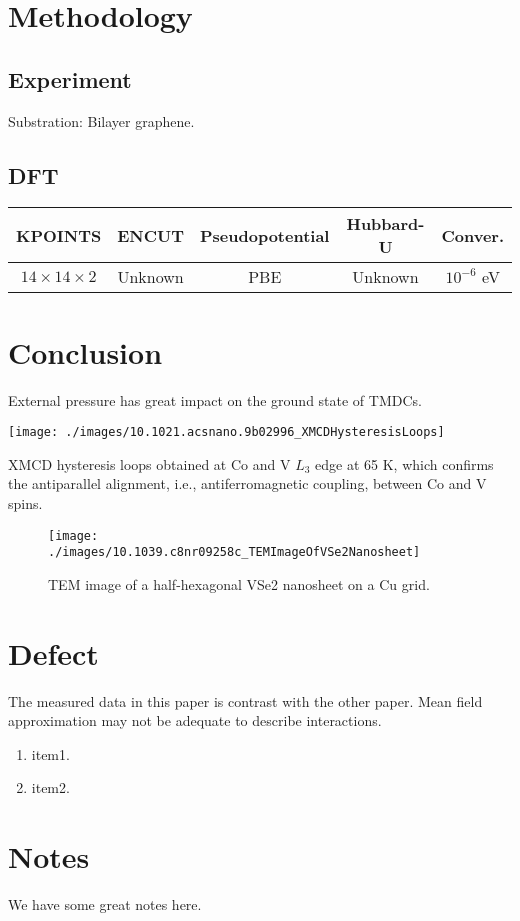 \section{Methodology}

\subsection{Experiment}
Substration: Bilayer graphene.

\subsection{DFT}
\begin{table}[h]
    \begin{tabular}{ccccc}
    \toprule
    KPOINTS                 & ENCUT  & Pseudopotential & Hubbard-U & Conver.      \\
    \midrule
    $14 \times 14 \times 2$ & Unknown& PBE             & Unknown   & $10^{-6}$ eV \\
    \bottomrule
    \end{tabular}
\end{table}

\section{Conclusion}
External pressure has great impact on the ground state of TMDCs.

\begin{marginfigure}
    \texttt{[image: ./images/10.1021.acsnano.9b02996\_XMCDHysteresisLoops]}
	\caption[XMCD hysteresis loops obtained at Co and V $L_3$ edge at 65 K]{
        XMCD hysteresis loops obtained at Co and V $L_3$ edge at 65 K, which confirms the antiparallel alignment, i.e., antiferromagnetic coupling, between Co and V spins.
	}
\end{marginfigure}

\begin{figure}[ht] 
    \texttt{[image: ./images/10.1039.c8nr09258c\_TEMImageOfVSe2Nanosheet]}
	\caption[TEM image of a half-hexagonal VSe2 nanosheet on a Cu grid]{
		TEM image of a half-hexagonal VSe2 nanosheet on a Cu grid.
	}
\end{figure}

\section{Defect}
The measured data in this paper is contrast with the other paper. Mean field approximation may not be adequate to describe interactions.
\begin{enumerate}
    \item item1.
    \item item2.
\end{enumerate}

\section{Notes}
We have some great notes here.